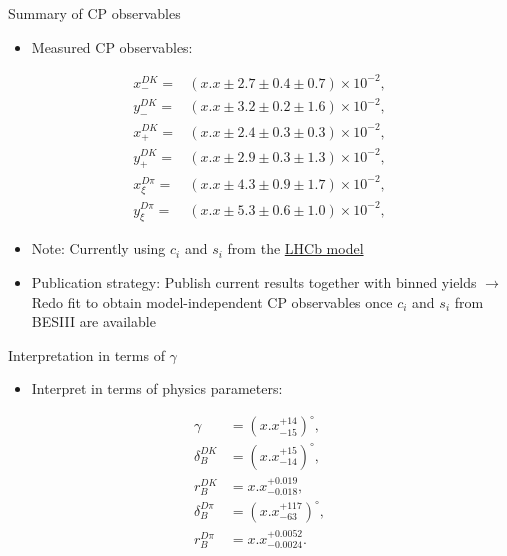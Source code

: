 \documentclass{beamer}
\begin{document}
\begin{frame}{Summary of CP observables}
  \begin{itemize}
    \item{Measured CP observables:}
  \end{itemize}
  \begin{align*}
    x_-^{DK} =& (x.x \pm 2.7 \pm 0.4 \pm 0.7)\times 10^{-2}, \\
    y_-^{DK} =& (x.x \pm 3.2 \pm 0.2 \pm 1.6)\times 10^{-2}, \\
    x_+^{DK} =& (x.x \pm 2.4 \pm 0.3 \pm 0.3)\times 10^{-2}, \\
    y_+^{DK} =& (x.x \pm 2.9 \pm 0.3 \pm 1.3)\times 10^{-2}, \\
    x_\xi^{D\pi} =& (x.x \pm 4.3 \pm 0.9 \pm 1.7)\times 10^{-2}, \\
    y_\xi^{D\pi} =& (x.x \pm 5.3 \pm 0.6 \pm 1.0)\times 10^{-2},
  \end{align*}
  \vspace{-0.5cm}
  \begin{itemize}
    \item{Note: Currently using $c_i$ and $s_i$ from the \underline{LHCb model}}
    \item{Publication strategy: Publish current results together with binned yields $\to$ Redo fit to obtain model-independent CP observables once $c_i$ and $s_i$ from BESIII are available}
  \end{itemize}
\end{frame}

\begin{frame}{Interpretation in terms of $\gamma$}
  \begin{itemize}
    \item{Interpret in terms of physics parameters:}
  \end{itemize}
  \begin{align*}
    \gamma &= (x.x^{+14}_{-15})^\circ, \\
    \delta_B^{DK} &= (x.x^{+15}_{-14})^\circ, \\
    r_B^{DK} &= x.x^{+0.019}_{-0.018}, \\
    \delta_B^{D\pi} &= (x.x^{+117}_{-63})^\circ, \\
    r_B^{D\pi} &= x.x^{+0.0052}_{-0.0024}.
  \end{align*}
\end{frame}
\end{document}
